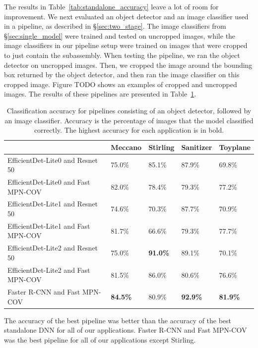 The results in Table~\ref{tab:standalone_accuracy} leave a lot of room for
improvement.
We next evaluated an object detector and an image classifier used in a pipeline,
as described in \S\ref{sec:two_stage}.
The image classifiers from \S\ref{sec:single_model} were trained and tested
on uncropped images, while the image classifiers in our pipeline setup were
trained on images that were cropped to just contain the subassembly.
When testing the pipeline, we ran the object detector on uncropped images.
Then, we cropped the image around the bounding box returned by the object
detector, and then ran the image classifier on this cropped image.
Figure TODO shows an examples of cropped and uncropped images.
The results of these pipelines are presented in
Table~\ref{tab:pipeline_accuracy}.

\begin{table}
\begin{tabular}{|l||l|l|l|l|}
  \hline
  & Meccano & Stirling & Sanitizer & Toyplane\\
  \hline
  \hline
  EfficientDet-Lite0 and Resnet 50 & 75.0\% & 85.1\% & 87.9\% & 69.8\%\\
  EfficientDet-Lite0 and Fast MPN-COV & 82.0\% & 78.4\% & 79.3\% & 77.2\%\\
  EfficientDet-Lite1 and Resnet 50 & 74.6\% & 70.3\% & 87.7\% & 70.9\%\\
  EfficientDet-Lite1 and Fast MPN-COV & 81.7\% & 66.6\% & 79.3\% & 77.7\%\\
  EfficientDet-Lite2 and Resnet 50 & 75.0\% & \textbf{91.0\%} & 89.1\% & 70.1\%\\
  EfficientDet-Lite2 and Fast MPN-COV & 81.5\% & 86.0\% & 80.6\% & 76.6\%\\
  Faster R-CNN and Fast MPN-COV & \textbf{84.5\%} & 80.9\% & \textbf{92.9\%} & \textbf{81.9\%}\\
  \hline
\end{tabular}
  \caption{
    Classification accuracy for pipelines consisting of an object detector,
    followed by an image classifier.
    Accuracy is the percentage of images that the model classified correctly.
    The highest accuracy for each application is in bold.
  }\label{tab:pipeline_accuracy}
\end{table}

The accuracy of the best pipeline was better than the accuracy of the best
standalone DNN for all of our applications.
Faster R-CNN and Fast MPN-COV was the best pipeline for all of our applications
except Stirling.

